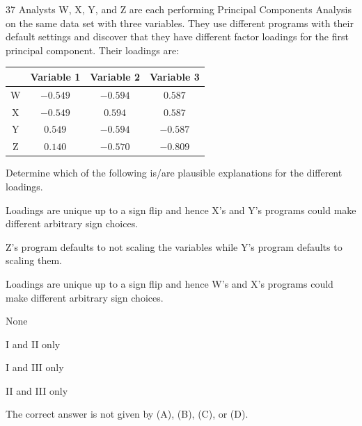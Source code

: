 \begin{question}{37}
Analysts W, X, Y, and Z are each performing Principal Components Analysis on the same data set with three variables. They use different programs with their default settings and discover that they have different factor loadings for the first principal component. Their loadings are:
\begin{center}
\begin{tabular}{|c|c|c|c|}
\hline
  & Variable 1 & Variable 2 & Variable 3 \\ \hline
W & $-0.549$   & $-0.594$   & $0.587$    \\ \hline
X & $-0.549$   & $0.594$    & $0.587$    \\ \hline
Y & $0.549$    & $-0.594$   & $-0.587$   \\ \hline
Z & $0.140$    & $-0.570$   & $-0.809$   \\ \hline
\end{tabular}
\end{center}

Determine which of the following is/are plausible explanations for the different loadings.
\begin{statements}
\item Loadings are unique up to a sign flip and hence X's and Y's programs could make different arbitrary sign choices.
\item Z's program defaults to not scaling the variables while Y's program defaults to scaling them.
\item Loadings are unique up to a sign flip and hence W's and X's programs could make different arbitrary sign choices.
\end{statements}

\begin{choices}
\item None
\item I and II only
\item I and III only
\item II and III only
\item The correct answer is not given by (A), (B), (C), or (D).
\end{choices}
\end{question}

